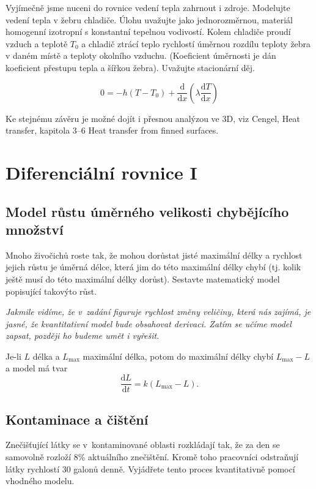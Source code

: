 Vyjímečně jsme nuceni do rovnice vedení tepla zahrnout i zdroje. 
Modelujte vedení tepla v žebru chladiče. Úlohu uvažujte jako
jednorozměrnou, materiál homogenní izotropní s konstantní tepelnou
vodivostí. Kolem chladiče proudí vzduch a teplotě $T_0$ a chladič
ztrácí teplo rychlostí úměrnou rozdílu teploty žebra v daném místě a
teploty okolního vzduchu. (Koeficient úměrnosti je dán koeficient přestupu tepla a šířkou žebra). Uvažujte stacionární děj.

\reseni

$$0=-h(T-T_0)+\frac{\mathrm d}{\mathrm dx}\left(\lambda \frac{\mathrm dT}{\mathrm dx}\right)$$


Ke stejnému závěru je možné dojít i přesnou analýzou ve 3D, viz Cengel, Heat transfer, kapitola 3–6 Heat transfer from finned surfaces.

\konec

\section{Diferenciální rovnice I}

\subsection{Model růstu úměrného velikosti chybějícího množství}  \label{krava}
Mnoho
živočichů roste tak, že mohou dorůstat jisté maximální délky a
rychlost jejich růstu je úměrná délce, která jim do této maximální
délky chybí (tj. kolik ještě musí do této maximální délky
dorůst). Sestavte matematický model popisující takovýto růst.


\textit{Jakmile vidíme, že v zadání figuruje rychlost změny veličiny,
  která nás zajímá, je jasné, že kvantitativní model bude obsahovat
  derivaci. Zatím se učíme model zapsat, později ho budeme umět i vyřešit.}

\def\derivace#1#2{\frac{\mathrm d#1}{\mathrm d#2}}

\reseni
Je-li $L$ délka a $L_{\max}$ maximální délka, potom do maximální délky chybí  $L_{\max}-L$ a model má tvar
$$\derivace Lt=k (L_{\max}-L).$$
\konec

\subsection{Kontaminace a čištění}
Znečišťující látky se v kontaminované oblasti rozkládají tak, že za den se samovolně rozloží 
$8\%$ aktuálního znečištění. Kromě toho pracovníci odstraňují látky rychlostí $30$
galonů denně. Vyjádřete tento proces kvantitativně pomocí vhodného
modelu.

